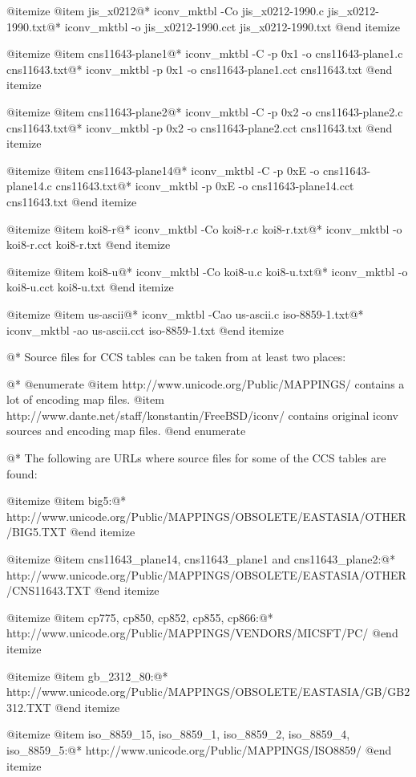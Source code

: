 @itemize
@item
jis_x0212@*
iconv_mktbl -Co jis_x0212-1990.c jis_x0212-1990.txt@*
iconv_mktbl -o jis_x0212-1990.cct jis_x0212-1990.txt
@end itemize

@itemize
@item
cns11643-plane1@*
iconv_mktbl -C -p 0x1 -o cns11643-plane1.c cns11643.txt@*
iconv_mktbl -p 0x1 -o cns11643-plane1.cct cns11643.txt
@end itemize

@itemize
@item
cns11643-plane2@*
iconv_mktbl -C -p 0x2 -o cns11643-plane2.c cns11643.txt@*
iconv_mktbl -p 0x2 -o cns11643-plane2.cct cns11643.txt
@end itemize

@itemize
@item
cns11643-plane14@*
iconv_mktbl -C -p 0xE -o cns11643-plane14.c cns11643.txt@*
iconv_mktbl -p 0xE -o cns11643-plane14.cct cns11643.txt
@end itemize

@itemize
@item
koi8-r@*
iconv_mktbl -Co koi8-r.c koi8-r.txt@*
iconv_mktbl -o koi8-r.cct koi8-r.txt
@end itemize

@itemize
@item
koi8-u@*
iconv_mktbl -Co koi8-u.c koi8-u.txt@*
iconv_mktbl -o koi8-u.cct koi8-u.txt
@end itemize

@itemize
@item
us-ascii@*
iconv_mktbl -Cao us-ascii.c iso-8859-1.txt@*
iconv_mktbl -ao us-ascii.cct iso-8859-1.txt
@end itemize

@*
Source files for CCS tables can be taken from at least two places:

@*
@enumerate
@item
http://www.unicode.org/Public/MAPPINGS/ contains a lot of encoding 
map files.
@item
http://www.dante.net/staff/konstantin/FreeBSD/iconv/ contains original 
iconv sources and encoding map files.
@end enumerate

@*
The following are URLs where source files for some of the CCS tables 
are found:

@itemize
@item
big5:@* 
http://www.unicode.org/Public/MAPPINGS/OBSOLETE/EASTASIA/OTHER/BIG5.TXT
@end itemize

@itemize
@item
cns11643_plane14, cns11643_plane1 and cns11643_plane2:@*
http://www.unicode.org/Public/MAPPINGS/OBSOLETE/EASTASIA/OTHER/CNS11643.TXT
@end itemize

@itemize
@item
cp775, cp850, cp852, cp855, cp866:@*
http://www.unicode.org/Public/MAPPINGS/VENDORS/MICSFT/PC/
@end itemize

@itemize
@item
gb_2312_80:@*
http://www.unicode.org/Public/MAPPINGS/OBSOLETE/EASTASIA/GB/GB2312.TXT
@end itemize

@itemize
@item
iso_8859_15, iso_8859_1, iso_8859_2, iso_8859_4, iso_8859_5:@*
http://www.unicode.org/Public/MAPPINGS/ISO8859/
@end itemize


